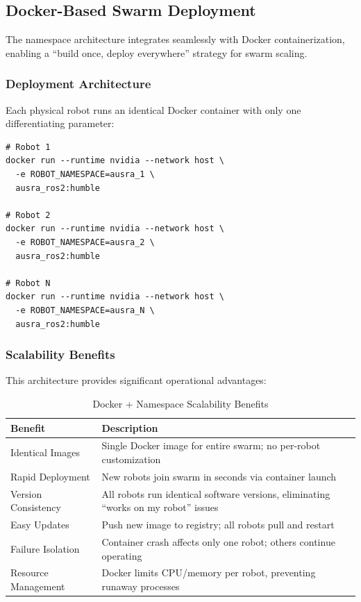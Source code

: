\subsection{Docker-Based Swarm Deployment}

The namespace architecture integrates seamlessly with Docker containerization, enabling a ``build once, deploy everywhere'' strategy for swarm scaling.

\subsubsection{Deployment Architecture}

Each physical robot runs an identical Docker container with only one differentiating parameter:

\begin{verbatim}
# Robot 1
docker run --runtime nvidia --network host \
  -e ROBOT_NAMESPACE=ausra_1 \
  ausra_ros2:humble

# Robot 2
docker run --runtime nvidia --network host \
  -e ROBOT_NAMESPACE=ausra_2 \
  ausra_ros2:humble

# Robot N
docker run --runtime nvidia --network host \
  -e ROBOT_NAMESPACE=ausra_N \
  ausra_ros2:humble
\end{verbatim}

\subsubsection{Scalability Benefits}

This architecture provides significant operational advantages:

\begin{table}[H]
\centering
\caption{Docker + Namespace Scalability Benefits}
\label{tab:docker_scalability}
\begin{tabular}{|l|p{9cm}|}
\hline
\textbf{Benefit} & \textbf{Description} \\
\hline
Identical Images & Single Docker image for entire swarm; no per-robot customization \\
\hline
Rapid Deployment & New robots join swarm in seconds via container launch \\
\hline
Version Consistency & All robots run identical software versions, eliminating ``works on my robot'' issues \\
\hline
Easy Updates & Push new image to registry; all robots pull and restart \\
\hline
Failure Isolation & Container crash affects only one robot; others continue operating \\
\hline
Resource Management & Docker limits CPU/memory per robot, preventing runaway processes \\
\hline
\end{tabular}
\end{table}

